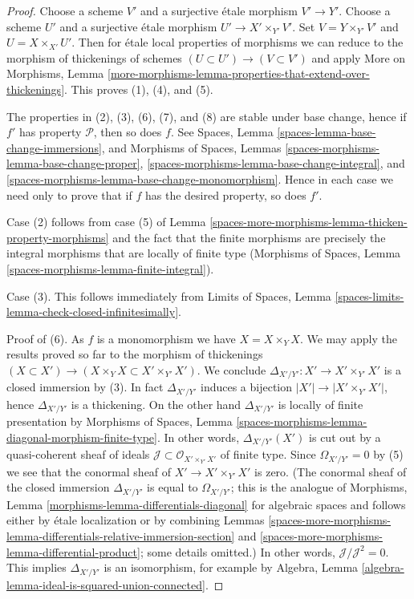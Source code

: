 \begin{proof}
Choose a scheme $V'$ and a surjective \'etale morphism $V' \to Y'$.
Choose a scheme $U'$ and a surjective \'etale morphism
$U' \to X' \times_{Y'} V'$. Set $V = Y \times_{Y'} V'$ and
$U = X \times_{X'} U'$. Then for \'etale local properties of morphisms
we can reduce to the morphism of thickenings of schemes
$(U \subset U') \to (V \subset V')$ and apply
More on Morphisms, Lemma
\ref{more-morphisms-lemma-properties-that-extend-over-thickenings}.
This proves (1), (4), and (5).

\medskip\noindent
The properties in (2), (3), (6), (7), and (8) are stable
under base change, hence if $f'$ has property $\mathcal{P}$, then so
does $f$. See Spaces, Lemma \ref{spaces-lemma-base-change-immersions},
and
Morphisms of Spaces, Lemmas
\ref{spaces-morphisms-lemma-base-change-proper},
\ref{spaces-morphisms-lemma-base-change-integral}, and
\ref{spaces-morphisms-lemma-base-change-monomorphism}.
Hence in each case we need only to prove that if $f$ has
the desired property, so does $f'$.

\medskip\noindent
Case (2) follows from case (5) of Lemma \ref{spaces-more-morphisms-lemma-thicken-property-morphisms}
and the fact that the finite morphisms are precisely
the integral morphisms that are locally of finite type
(Morphisms of Spaces, Lemma \ref{spaces-morphisms-lemma-finite-integral}).

\medskip\noindent
Case (3). This follows immediately from
Limits of Spaces, Lemma
\ref{spaces-limits-lemma-check-closed-infinitesimally}.

\medskip\noindent
Proof of (6). As $f$ is a monomorphism we have $X = X \times_Y X$.
We may apply the results proved so far to the morphism of thickenings
$(X \subset X') \to (X \times_Y X \subset X' \times_{Y'} X')$.
We conclude $\Delta_{X'/Y'} : X' \to X' \times_{Y'} X'$
is a closed immersion by (3). In fact $\Delta_{X'/Y'}$ induces a bijection
$|X'| \to |X' \times_{Y'} X'|$, hence $\Delta_{X'/Y'}$ is a thickening.
On the other hand $\Delta_{X'/Y'}$ is locally of finite presentation by
Morphisms of Spaces, Lemma
\ref{spaces-morphisms-lemma-diagonal-morphism-finite-type}.
In other words, $\Delta_{X'/Y'}(X')$ is cut out by
a quasi-coherent sheaf of ideals
$\mathcal{J} \subset \mathcal{O}_{X' \times_{Y'} X'}$ of finite type.
Since $\Omega_{X'/Y'} = 0$ by (5) we see that
the conormal sheaf of $X' \to X' \times_{Y'} X'$ is zero.
(The conormal sheaf of the closed immersion $\Delta_{X'/Y'}$ is equal to
$\Omega_{X'/Y'}$; this is the analogue of
Morphisms, Lemma \ref{morphisms-lemma-differentials-diagonal}
for algebraic spaces and follows either by \'etale localization
or by combining
Lemmas \ref{spaces-more-morphisms-lemma-differentials-relative-immersion-section} and
\ref{spaces-more-morphisms-lemma-differential-product}; some details omitted.)
In other words, $\mathcal{J}/\mathcal{J}^2 = 0$.
This implies $\Delta_{X'/Y'}$ is an isomorphism, for example
by Algebra, Lemma \ref{algebra-lemma-ideal-is-squared-union-connected}.


\end{proof}

